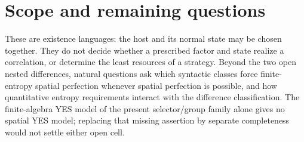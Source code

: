 \section{Scope and remaining questions}\label{sec:scope}
These are existence languages: the host and its normal state may be
chosen together. They do not decide whether a prescribed factor and
state realize a correlation, or determine the least resources of a
strategy. Beyond the two open nested differences, natural questions
ask which syntactic classes force finite-entropy spatial perfection
whenever spatial perfection is possible, and how quantitative
entropy requirements interact with the difference classification.
The finite-algebra YES model of the present selector/group family
alone gives no spatial YES model; replacing that missing assertion
by separate completeness would not settle either open cell.
